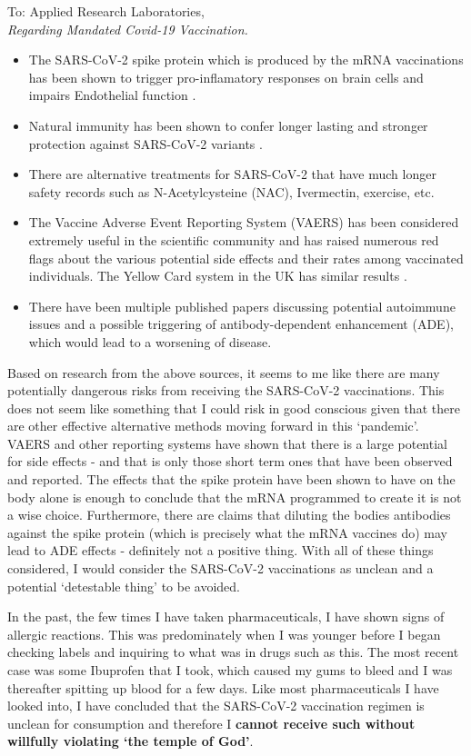 \documentclass[]{letter}
\begin{document}
\begin{letter}{To: Applied Research Laboratories,\\ \textit{Regarding Mandated Covid-19 Vaccination.}}
\begin{itemize}
	\item The SARS-CoV-2 spike protein which is produced by the mRNA vaccinations has been shown to trigger pro-inflamatory responses on brain cells \cite{covid: spike} and impairs Endothelial function \cite{covid: spike2}.
	\item Natural immunity has been shown to confer longer lasting and stronger protection against SARS-CoV-2 variants \cite{covid: natural}.
	\item There are alternative treatments for SARS-CoV-2 that have much longer safety records such as N-Acetylcysteine (NAC), Ivermectin, exercise, etc\cite{Ivermectin}.
	\item The Vaccine Adverse Event Reporting System (VAERS) has been considered extremely useful in the scientific community and has raised numerous red flags about the various potential side effects and their rates among vaccinated individuals. The Yellow Card system in the UK has similar results \cite{Yellow Card}.
	\item There have been multiple published papers discussing potential autoimmune issues \cite{prion} and a possible triggering of antibody-dependent enhancement (ADE), which would lead to a worsening of disease\cite{ADE}. 
\end{itemize}

\hspace{1cm}Based on research from the above sources, it seems to me like there are many potentially dangerous risks from receiving the SARS-CoV-2 vaccinations. This does not seem like something that I could risk in good conscious given that there are other effective alternative methods moving forward in this `pandemic'. VAERS and other reporting systems have shown that there is a large potential for side effects - and that is only those short term ones that have been observed and reported. The effects that the spike protein have been shown to have on the body alone is enough to conclude that the mRNA programmed to create it is not a wise choice. Furthermore, there are claims that diluting the bodies antibodies against the spike protein (which is precisely what the mRNA vaccines do) may lead to ADE effects - definitely not a positive thing. With all of these things considered, I would consider the SARS-CoV-2 vaccinations as unclean and a potential `detestable thing' to be avoided.

\hspace{1cm}In the past, the few times I have taken pharmaceuticals, I have shown signs of allergic reactions. This was predominately when I was younger before I began checking labels and inquiring to what was in drugs such as this. The most recent case was some Ibuprofen that I took, which caused my gums to bleed and I was thereafter spitting up blood for a few days. Like most pharmaceuticals I have looked into, I have concluded that the SARS-CoV-2 vaccination regimen is unclean for consumption and therefore I \textbf{cannot receive such without willfully violating `the temple of God'}.



\end{letter}
\end{document}
